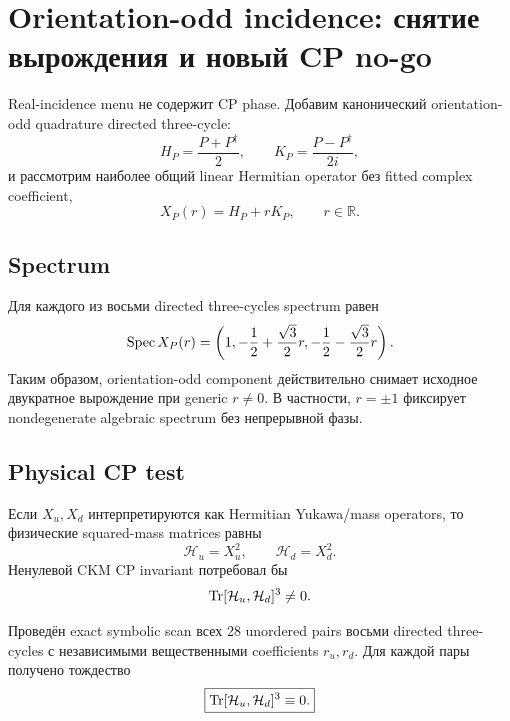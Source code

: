 \chapter{Orientation-odd incidence: снятие вырождения и новый CP no-go}

Real-incidence menu не содержит CP phase. Добавим канонический orientation-odd
quadrature directed three-cycle:
\begin{equation}
H_P=\frac{P+P^\dagger}{2},
\qquad
K_P=\frac{P-P^\dagger}{2i},
\end{equation}
и рассмотрим наиболее общий linear Hermitian operator без fitted complex
coefficient,
\begin{equation}
X_P(r)=H_P+rK_P,
\qquad r\in\mathbb R.
\end{equation}

\section{Spectrum}

Для каждого из восьми directed three-cycles spectrum равен
\begin{equation}
\operatorname{Spec} X_P(r)=
\left(
1,
-\frac12+\frac{\sqrt3}{2}r,
-\frac12-\frac{\sqrt3}{2}r
\right).
\end{equation}
Таким образом, orientation-odd component действительно снимает исходное
двукратное вырождение при generic \(r\ne0\). В частности, \(r=\pm1\)
фиксирует nondegenerate algebraic spectrum без непрерывной фазы.

\section{Physical CP test}

Если \(X_u,X_d\) интерпретируются как Hermitian Yukawa/mass operators, то
физические squared-mass matrices равны
\begin{equation}
\mathcal H_u=X_u^2,
\qquad
\mathcal H_d=X_d^2.
\end{equation}
Ненулевой CKM CP invariant потребовал бы
\begin{equation}
\operatorname{Tr}[\mathcal H_u,\mathcal H_d]^3\ne0.
\end{equation}

Проведён exact symbolic scan всех 28 unordered pairs восьми directed
three-cycles с независимыми вещественными coefficients \(r_u,r_d\). Для
каждой пары получено тождество
\begin{equation}
\boxed{\operatorname{Tr}[\mathcal H_u,\mathcal H_d]^3\equiv0.}
\end{equation}

